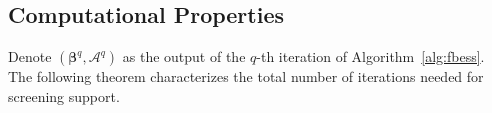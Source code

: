\subsection{Computational Properties}\label{sec:computational-properties}
Denote $(\boldsymbol \beta^q, \mathcal{A}^q)$ as the output of the $q$-th iteration of Algorithm~\ref{alg:fbess}. The following theorem characterizes the total number of iterations needed for screening support.

